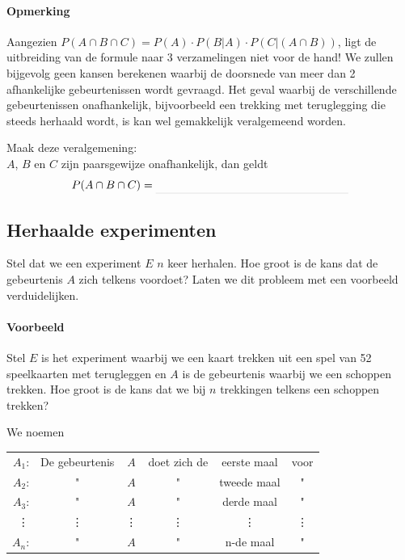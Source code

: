 \documentclass[12pt,twoside]{article}
\begin{document}
\paragraph*{Opmerking}

Aangezien $P(A\cap B\cap C)=P(A)\cdot P(B|A) \cdot P(C|(A\cap B))$, ligt de uitbreiding van de formule naar 3 verzamelingen niet voor de hand! We zullen bijgevolg geen kansen berekenen waarbij de doorsnede van meer dan 2 afhankelijke gebeurtenissen wordt gevraagd. Het geval waarbij de verschillende gebeurtenissen onafhankelijk, bijvoorbeeld een trekking met teruglegging die steeds herhaald wordt, is kan wel gemakkelijk veralgemeend worden.

\begin{oefening}
Maak deze veralgemening:\\
$A$, $B$ en $C$ zijn paarsgewijze onafhankelijk, dan geldt $$P(A\cap B\cap C)=\arule{6cm}$$
\end{oefening}

\subsection{Herhaalde experimenten}

Stel dat we een experiment $E$ $n$ keer herhalen. Hoe groot is de kans dat de gebeurtenis $A$ zich telkens voordoet?
Laten we dit probleem met een voorbeeld verduidelijken.


\paragraph*{Voorbeeld}
Stel $E$ is het experiment waarbij we een kaart trekken uit een spel van 52 speelkaarten met terugleggen en $A$ is de gebeurtenis waarbij we een schoppen trekken.
Hoe groot is de kans dat we bij $n$ trekkingen telkens een schoppen trekken?

We noemen 
\begin{center}
  \renewcommand{\arraystretch}{1}
  \begin{tabular}{r@{ }c@{ }c@{ }c@{ }c@{ }c}
    $A_1$: & De gebeurtenis & $A$ & doet zich de & eerste maal & voor\\
    $A_2$: &        "       & $A$ &       "      & tweede maal &   " \\
    $A_3$: &        "       & $A$ &       "      & derde maal &   " \\
    \vdots &    \vdots      & \vdots &  \vdots   &  \vdots  &\vdots \\
    $A_n$: &        "       & $A$ &       "      & n-de maal &   " \\
  \end{tabular}
\end{center}
\end{document}
